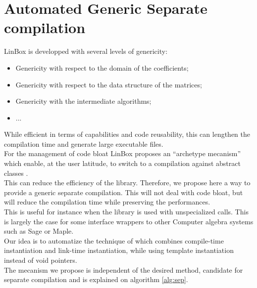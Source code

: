 \documentclass[runningheads,a4paper]{llncs}
\newcommand{\linboxsp}{{\sc LinBox}\xspace}
\begin{document}
\section{Automated Generic Separate compilation}
\linboxsp is developped with several levels of genericity:
\begin{itemize}
\item Genericity with respect to the domain of the coefficients;
\item Genericity with respect to the data structure of the matrices;
\item Genericity with the intermediate algorithms;
\item ...
\end{itemize}
While efficient in terms of capabilities and code reusability, this
can lengthen the compilation time and generate large executable files.\\
For the management of code bloat \linboxsp proposes an ``archetype
mecanism'' which enable, at the user latitude, to switch to a
compilation against abstract classes \cite[\S 2.1]{jgd:2002:icms}.\\
This can reduce the efficiency of the library. Therefore, we propose
here a way to provide a generic separate compilation. This will not
deal with code bloat, but will reduce the compilation time while
preserving the performances.\\
This is useful for instance when the library is used with
unspecialized calls. This is largely the case for some interface
wrappers to other Computer algebra systems such as {\sc Sage} or {\sc Maple}.\\
Our idea is to automatize the technique of
\cite{Erlingsson:1996:issac} which combines compile-time instantiation
and link-time instantiation, while using template instantiation
instead of void pointers.\\
The mecanism we propose is independent of the desired method, candidate
for separate compilation and is explained on algorithm \ref{alg:sep}.
\end{document}
